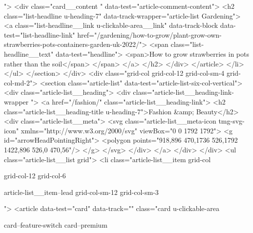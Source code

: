 {{{			
			 ">
<div class="card__content " data-test="article-comment-content">
<h2 class="list-headline  u-heading-7" data-track-wrapper="article-list Gardening">
<a class="list-headline__link u-clickable-area__link" data-track-block data-test="list-headline-link" href="/gardening/how-to-grow/plant-grow-own-strawberries-pots-containers-garden-uk-2022/">
<span class="list-headline__text" data-test="headline">
<span>How to grow strawberries in pots rather than the soil</span>
</span>
</a>
</h2>
</div>
</article>
</li>
</ul>
</section>
</div>
<div class="grid-col grid-col-12 grid-col-sm-4 grid-col-md-2">
<section class="article-list" data-test="article-list-six-col-vertical">
<div class="article-list__heading">
<div class="article-list__heading-link-wrapper
				">
<a href="/fashion/" class="article-list__heading-link">
<h2 class="article-list__heading-title u-heading-7">Fashion &amp; Beauty</h2>
<div class="article-list__meta">
<svg class="article-list__meta-icon  tmg-svg-icon" xmlns="http://www.w3.org/2000/svg" viewBox="0 0 1792 1792">
<g id="arrowHeadPointingRight">
<polygon points="918,896 470,1736 526,1792 1422,896 526,0 470,56"/>
</g>
</svg>
</div>
</a>
</div>
</div>
<ul class="article-list__list grid">
<li class="article-list__item
				grid-col
				
				
				
				grid-col-12
				grid-col-6
				
				
				
				
				article-list__item--lead grid-col-sm-12
				grid-col-sm-3
				
				
				">
<article data-test="card" data-track="" class="card
			u-clickable-area
			
			card--feature-switch
			card--premium
			
			
			
			
			
}}}
